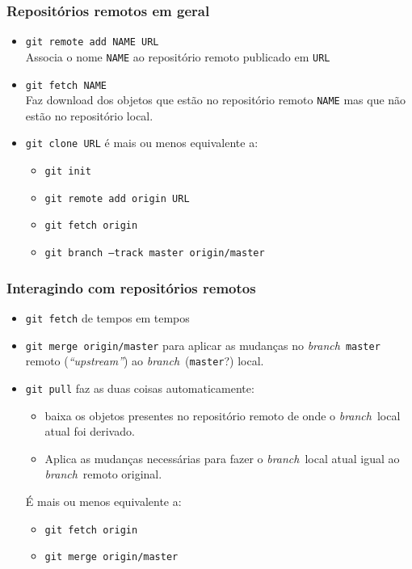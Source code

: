 \documentclass{beamer}
\newcommand{\branch}{\emph{branch}}
\begin{document}
\begin{frame}
  \frametitle{Repositórios remotos em geral}

  \begin{itemize}
    \item \texttt{git remote add NAME URL}\\
      Associa o nome \texttt{NAME} ao repositório remoto publicado em
      \texttt{URL}
      \pause

    \item \texttt{git fetch NAME}\\
      Faz download dos objetos que estão no repositório remoto
      \texttt{NAME} mas que não estão no repositório local.
      \pause

    \item \texttt{git clone URL} é mais ou menos equivalente a:
      \begin{itemize}
        \item \texttt{git init}
        \item \texttt{git remote add origin URL}
        \item \texttt{git fetch origin}
        \item \texttt{git branch --track master origin/master}
      \end{itemize}
  \end{itemize}
\end{frame}

\begin{frame}
  \frametitle{Interagindo com repositórios remotos}
  \begin{itemize}
    \item \texttt{git fetch} de tempos em tempos
    \item \texttt{git merge origin/master} para aplicar as
      mudanças no \branch\ \texttt{master} remoto (\emph{``upstream''})
      ao \branch\ (\texttt{master}?) local.
      \pause

    \item \texttt{git pull} faz as duas coisas automaticamente:
      \begin{itemize}
        \item baixa os objetos presentes no repositório remoto de onde o
          \branch\ local atual foi derivado.
        \item Aplica as mudanças necessárias para fazer o \branch\ local
          atual igual ao \branch\ remoto original.
      \end{itemize}
      \pause

      É mais ou menos equivalente a:
      \begin{itemize}
        \item \texttt{git fetch origin}
        \item \texttt{git merge origin/master}
      \end{itemize}
  \end{itemize}
\end{frame}
\end{document}
